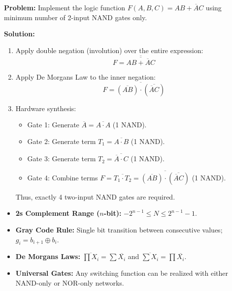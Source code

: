 \begin{examplebox}
\textbf{Problem:} Implement the logic function $F(A, B, C) = A B + \overline{A} C$ using minimum number of 2-input NAND gates only.

\textbf{Solution:}
\begin{enumerate}
    \item Apply double negation (involution) over the entire expression:
    \begin{equation}
    F = \overline{\overline{A B + \overline{A} C}}
    \end{equation}
    \item Apply De Morgan\textquotesingle s Law to the inner negation:
    \begin{equation}
    F = \overline{(\overline{A B}) \cdot (\overline{\overline{A} C})}
    \end{equation}
    \item Hardware synthesis:
    \begin{itemize}
        \item Gate 1: Generate $\overline{A} = \overline{A \cdot A}$ (1 NAND).
        \item Gate 2: Generate term $T_1 = \overline{A \cdot B}$ (1 NAND).
        \item Gate 3: Generate term $T_2 = \overline{\overline{A} \cdot C}$ (1 NAND).
        \item Gate 4: Combine terms $F = \overline{T_1 \cdot T_2} = \overline{(\overline{A B}) \cdot (\overline{\overline{A} C})}$ (1 NAND).
    \end{itemize}
    Thus, exactly 4 two-input NAND gates are required.
\end{enumerate}
\end{examplebox}

\begin{takeawaybox}
\begin{itemize}
    \item \textbf{2\textquotesingle s Complement Range ($n$-bit):} $-2^{n-1} \le N \le 2^{n-1}-1$.
    \item \textbf{Gray Code Rule:} Single bit transition between consecutive values; $g_i = b_{i+1} \oplus b_i$.
    \item \textbf{De Morgan\textquotesingle s Laws:} $\overline{\prod X_i} = \sum \overline{X_i}$ and $\overline{\sum X_i} = \prod \overline{X_i}$.
    \item \textbf{Universal Gates:} Any switching function can be realized with either NAND-only or NOR-only networks.
\end{itemize}
\end{takeawaybox}
